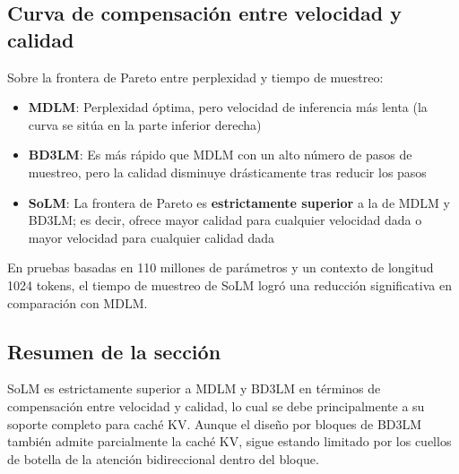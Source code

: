 \subsection{Curva de compensación entre velocidad y calidad}

Sobre la frontera de Pareto entre perplexidad y tiempo de muestreo:

\begin{itemize}
    \item \textbf{MDLM}: Perplexidad óptima, pero velocidad de inferencia más lenta (la curva se sitúa en la parte inferior derecha)
    \item \textbf{BD3LM}: Es más rápido que MDLM con un alto número de pasos de muestreo, pero la calidad disminuye drásticamente tras reducir los pasos
    \item \textbf{SoLM}: La frontera de Pareto es \textbf{estrictamente superior} a la de MDLM y BD3LM; es decir, ofrece mayor calidad para cualquier velocidad dada o mayor velocidad para cualquier calidad dada
\end{itemize}

En pruebas basadas en 110 millones de parámetros y un contexto de longitud 1024 tokens, el tiempo de muestreo de SoLM logró una reducción significativa en comparación con MDLM.

\subsection{Resumen de la sección}

SoLM es estrictamente superior a MDLM y BD3LM en términos de compensación entre velocidad y calidad, lo cual se debe principalmente a su soporte completo para caché KV. Aunque el diseño por bloques de BD3LM también admite parcialmente la caché KV, sigue estando limitado por los cuellos de botella de la atención bidireccional dentro del bloque.

\newpage

